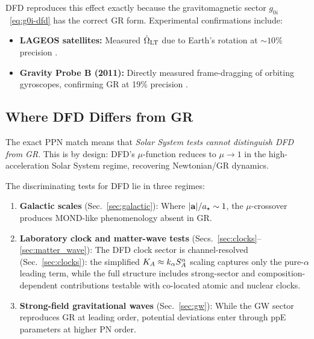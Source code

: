 DFD reproduces this effect exactly because the gravitomagnetic sector $g_{0i}$~\eqref{eq:g0i-dfd} has the correct GR form. Experimental confirmations include:
\begin{itemize}
\item \textbf{LAGEOS satellites:} Measured $\dot{\Omega}_{\rm LT}$ due to Earth's rotation at $\sim 10\%$ precision \cite{Ciufolini2004}.
\item \textbf{Gravity Probe B (2011):} Directly measured frame-dragging of orbiting gyroscopes, confirming GR at 19\% precision \cite{Everitt2011}.
\end{itemize}

\subsection{Where DFD Differs from GR}\label{sec:ppn-where-different}

The exact PPN match means that \textit{Solar System tests cannot distinguish DFD from GR}. This is by design: DFD's $\mu$-function reduces to $\mu \to 1$ in the high-acceleration Solar System regime, recovering Newtonian/GR dynamics.

The discriminating tests for DFD lie in three regimes:

\begin{enumerate}
\item \textbf{Galactic scales} (Sec.~\ref{sec:galactic}): Where $|\mathbf{a}|/a_\star \sim 1$, the $\mu$-crossover produces MOND-like phenomenology absent in GR.

\item \textbf{Laboratory clock and matter-wave tests} (Secs.~\ref{sec:clocks}--\ref{sec:matter_wave}): The DFD clock sector is channel-resolved (Sec.~\ref{sec:clocks}): the simplified $K_A \approx k_\alpha S_A^{\alpha}$ scaling captures only the pure-$\alpha$ leading term, while the full structure includes strong-sector and composition-dependent contributions testable with co-located atomic and nuclear clocks.

\item \textbf{Strong-field gravitational waves} (Sec.~\ref{sec:gw}): While the GW sector reproduces GR at leading order, potential deviations enter through ppE parameters at higher PN order.
\end{enumerate}

